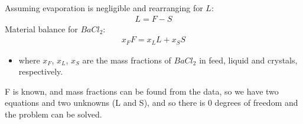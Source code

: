 \documentclass[letterpaper,10pt,english]{jupyterBook}
\begin{document}
\sphinxAtStartPar
Assuming evaporation is negligible and rearranging for \(L\):
\begin{equation*}
\begin{split}L=F-S\end{split}
\end{equation*}
\sphinxAtStartPar
Material balance for \(BaCl_2\):
\begin{equation*}
\begin{split}
x_F{F} = x_LL + x_SS
\end{split}
\end{equation*}\begin{itemize}
\item {} 
\sphinxAtStartPar
where \(x_F\), \(x_L\), \(x_S\) are the mass fractions of \(BaCl_2\) in feed, liquid and crystals, respectively.

\end{itemize}

\sphinxAtStartPar
F is known, and mass fractions can be found from the data, so we have two equations and two unknowns (L and S), and so there is 0 degrees of freedom and the problem can be solved.
\end{document}
